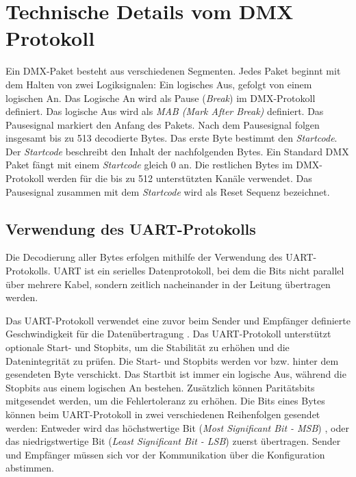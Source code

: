 \chapter{Technische Details vom DMX Protokoll}

Ein DMX-Paket besteht aus verschiedenen Segmenten. Jedes Paket beginnt mit dem Halten von zwei Logiksignalen: Ein logisches Aus, gefolgt von einem logischen An. Das Logische An wird als Pause (\emph{Break}) im DMX-Protokoll definiert. Das logische Aus wird als \emph{MAB (Mark After Break)} definiert. Das Pausesignal markiert den Anfang des Pakets. Nach dem Pausesignal folgen insgesamt bis zu 513 decodierte Bytes. Das erste Byte bestimmt den \emph{Startcode}. Der \emph{Startcode} beschreibt den Inhalt der nachfolgenden Bytes. Ein Standard DMX Paket fängt mit einem \emph{Startcode} gleich 0 an. Die restlichen Bytes im DMX-Protokoll werden für die bis zu 512 unterstützten Kanäle verwendet\cite[S.14]{DMX512-Protocol-Standard}. Das Pausesignal zusammen mit dem \emph{Startcode} wird als Reset Sequenz bezeichnet\cite[S.17]{DMX512-Protocol-Standard}.

\section{Verwendung des UART-Protokolls}

Die Decodierung aller Bytes erfolgen mithilfe der Verwendung des UART-Protokolls. UART ist ein serielles Datenprotokoll, bei dem die Bits nicht parallel über mehrere Kabel, sondern zeitlich nacheinander in der Leitung übertragen werden.

Das UART-Protokoll verwendet eine zuvor beim Sender und Empfänger definierte Geschwindigkeit für die Datenübertragung \cite[S.2]{UartStandard}.  Das UART-Protokoll unterstützt optionale Start- und Stopbits, um die Stabilität zu erhöhen und die Datenintegrität zu prüfen\cite[S.2]{UartStandard}. Die Start- und Stopbits werden vor bzw. hinter dem gesendeten Byte verschickt. Das Startbit ist immer ein logische Aus, während die Stopbits aus einem logischen An bestehen\cite[S.2]{UartStandard}. Zusätzlich können Paritätsbits mitgesendet werden, um die Fehlertoleranz zu erhöhen\cite[S.2]{UartStandard}. Die Bits eines Bytes können beim UART-Protokoll in zwei verschiedenen Reihenfolgen gesendet werden: Entweder wird das
höchstwertige Bit (\emph{Most Significant Bit - MSB}) , oder das niedrigstwertige Bit (\emph{Least Significant Bit - LSB}) zuerst übertragen\cite[S.2]{UartStandard}. Sender und Empfänger müssen sich vor der Kommunikation über die Konfiguration abstimmen.

